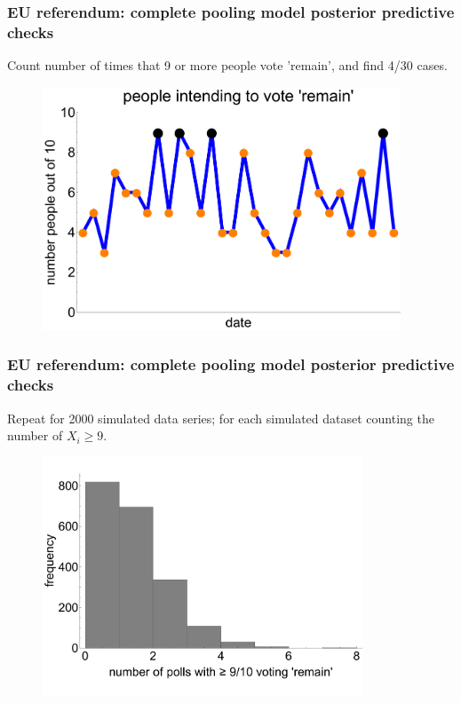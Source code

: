\documentclass[handout]{beamer}
\begin{document}
\begin{frame}
	\frametitle{ EU referendum: complete pooling model posterior predictive checks}
	Count number of times that 9 or more people vote 'remain', and find 4/30 cases.
	
	\begin{figure}[ht]
		\centerline{\includegraphics[width=0.95\textwidth]{figures/lec6_euReferendumHighlighted.pdf}}
	\end{figure}
	
\end{frame}

\begin{frame}
	\frametitle{ EU referendum: complete pooling model posterior predictive checks}
	Repeat for 2000 simulated data series; for each simulated dataset counting the number of $X_i\geq 9$.
	
	\begin{figure}[ht]
		\centerline{\includegraphics[width=0.85\textwidth]{figures/lec6_euHomoPPCRuns1.pdf}}
	\end{figure}
	
\end{frame}
\end{document}
